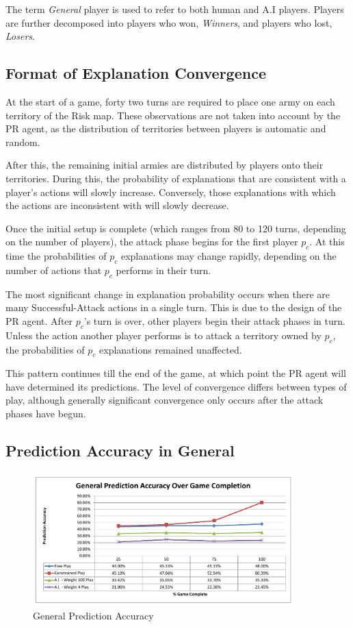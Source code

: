 \documentclass[parskip]{cs4rep}
\begin{document}
The term \textit{General} player is used to refer to both human and A.I players. Players are further decomposed into players who won, \textit{Winners}, and players who lost, \textit{Losers}.

\subsection{Format of Explanation Convergence}

At the start of a game, forty two turns are required to place one army on each territory of the Risk map. These observations are not taken into account by the PR agent, as the distribution of territories between players is automatic and random.

After this, the remaining initial armies are distributed by players onto their territories. During this, the probability of explanations that are consistent with a player's actions will slowly increase. Conversely, those explanations with which the actions are inconsistent with will slowly decrease.

Once the initial setup is complete (which ranges from 80 to 120 turns, depending on the number of players), the attack phase begins for the first player $p_c$. At this time the probabilities of $p_c$ explanations may change rapidly, depending on the number of actions that $p_c$ performs in their turn.

The most significant change in explanation probability occurs when there are many Successful-Attack actions in a single turn. This is due to the design of the PR agent.
After $p_c$'s turn is over, other players begin their attack phases in turn. Unless the action another player performs is to attack a territory owned by $p_c$, the probabilities of $p_c$ explanations remained unaffected.

This pattern continues till the end of the game, at which point the PR agent will have determined its predictions. The level of convergence differs between types of play, although generally significant convergence only occurs after the attack phases have begun.

\newpage

\subsection{Prediction Accuracy in General}

\begin{figure}[h]
\centerline{
\includegraphics[width=0.9\textwidth]{images/general-game-complete.pdf}
}
\caption{General Prediction Accuracy}
\label{fig:dom-debug-gui}
\end{figure}
\end{document}

